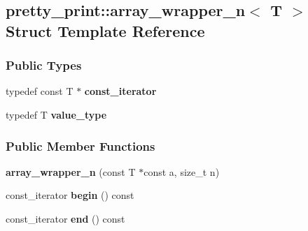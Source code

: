 \hypertarget{structpretty__print_1_1array__wrapper__n}{}\subsection{pretty\+\_\+print\+:\+:array\+\_\+wrapper\+\_\+n$<$ T $>$ Struct Template Reference}
\label{structpretty__print_1_1array__wrapper__n}
\subsubsection*{Public Types}
\begin{DoxyCompactItemize}
\item 
typedef const T $\ast$ {\bfseries const\+\_\+iterator}\hypertarget{structpretty__print_1_1array__wrapper__n_aa8b7b8cc2f85a27f7ffadaa2174e725e}{}\label{structpretty__print_1_1array__wrapper__n_aa8b7b8cc2f85a27f7ffadaa2174e725e}

\item 
typedef T {\bfseries value\+\_\+type}\hypertarget{structpretty__print_1_1array__wrapper__n_a6ad06ae74e53a3466794e81100fad14e}{}\label{structpretty__print_1_1array__wrapper__n_a6ad06ae74e53a3466794e81100fad14e}

\end{DoxyCompactItemize}
\subsubsection*{Public Member Functions}
\begin{DoxyCompactItemize}
\item 
{\bfseries array\+\_\+wrapper\+\_\+n} (const T $\ast$const a, size\+\_\+t n)\hypertarget{structpretty__print_1_1array__wrapper__n_a4250495cf8cbdae2b32260b80b617ad7}{}\label{structpretty__print_1_1array__wrapper__n_a4250495cf8cbdae2b32260b80b617ad7}

\item 
const\+\_\+iterator {\bfseries begin} () const \hypertarget{structpretty__print_1_1array__wrapper__n_a146a0ef3978cc3aa4a172c9cf86f50b9}{}\label{structpretty__print_1_1array__wrapper__n_a146a0ef3978cc3aa4a172c9cf86f50b9}

\item 
const\+\_\+iterator {\bfseries end} () const \hypertarget{structpretty__print_1_1array__wrapper__n_ae25f9b7e055cae44d7ad3744fdbcf2a5}{}\label{structpretty__print_1_1array__wrapper__n_ae25f9b7e055cae44d7ad3744fdbcf2a5}

\end{DoxyCompactItemize}
